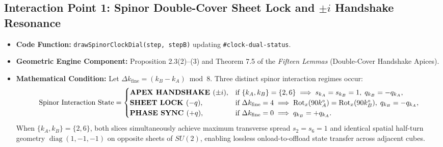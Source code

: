 \documentclass[11pt, a4paper]{article}
\begin{document}
\subsection{Interaction Point 1: Spinor Double-Cover Sheet Lock and \texorpdfstring{$\pm i$}{+-i} Handshake Resonance}
\begin{itemize}
    \item \textbf{Code Function:} \texttt{drawSpinorClockDial(step, stepB)} updating \texttt{\#clock-dual-status}.
    \item \textbf{Geometric Engine Component:} Proposition 2.3(2)--(3) and Theorem 7.5 of the \textit{Fifteen Lemmas} (Double-Cover Handshake Apices).
    \item \textbf{Mathematical Condition:}
    Let $\Delta k_{\text{fine}} = (k_B - k_A) \bmod 8$. Three distinct spinor interaction regimes occur:
    \begin{equation}
    \text{Spinor Interaction State} = \begin{cases}
    \text{\textbf{APEX HANDSHAKE }} (\pm i), & \text{if } \{k_A, k_B\} = \{2, 6\} \implies s_{k_A} = s_{k_B} = 1, \; q_{k_B} = -q_{k_A}, \\
    \text{\textbf{SHEET LOCK }} (-q), & \text{if } \Delta k_{\text{fine}} = 4 \implies \operatorname{Rot}_x(90k_A^\circ) = \operatorname{Rot}_x(90k_B^\circ), \; q_{k_B} = -q_{k_A}, \\
    \text{\textbf{PHASE SYNC }} (+q), & \text{if } \Delta k_{\text{fine}} = 0 \implies q_{k_B} = +q_{k_A}.
    \end{cases}
    \end{equation}
    When $\{k_A, k_B\} = \{2, 6\}$, both slices simultaneously achieve maximum transverse spread $s_2 = s_6 = 1$ and identical spatial half-turn geometry $\operatorname{diag}(1, -1, -1)$ on opposite sheets of $SU(2)$, enabling lossless onload-to-offload state transfer across adjacent cubes.
\end{itemize}
\end{document}
